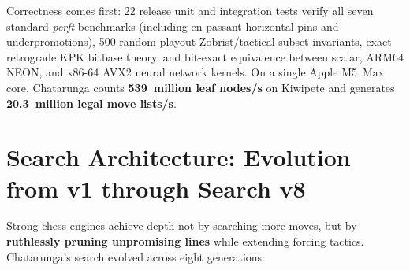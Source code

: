 \documentclass[10.5pt,letterpaper]{article}
\begin{document}
Correctness comes first: 22 release unit and integration tests verify all seven standard \emph{perft} benchmarks (including en-passant horizontal pins and underpromotions), 500 random playout Zobrist/tactical-subset invariants, exact retrograde KPK bitbase theory, and bit-exact equivalence between scalar, ARM64 NEON, and x86-64 AVX2 neural network kernels. On a single Apple M5~Max core, Chatarunga counts \textbf{539~million leaf nodes/s} on Kiwipete and generates \textbf{20.3~million legal move lists/s}.

\section{Search Architecture: Evolution from v1 through Search v8}

Strong chess engines achieve depth not by searching more moves, but by \textbf{ruthlessly pruning unpromising lines} while extending forcing tactics. Chatarunga's search evolved across eight generations:
\end{document}
